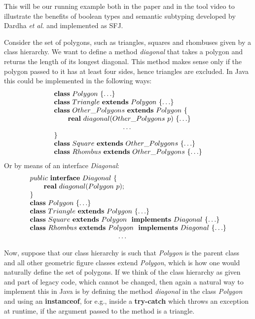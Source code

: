 \documentclass[runningheads]{llncs}
\begin{document}
\begin{example}[Polygons]
\label{polygons}
This will be our running example both in the paper and in the tool video \cite{UD20} to illustrate the benefits of boolean types and semantic subtyping developed by Dardha \emph{et al.} \cite{Dardha2013,Dardha2017} and implemented as SFJ.

Consider the set of polygons, such as triangles, squares and rhombuses given by a class hierarchy.
We want to define a method \emph{diagonal} that takes a polygon and returns the length of its longest diagonal. This method makes sense only if the polygon passed to it has at least four sides, hence triangles are excluded.
In Java this could be implemented in the following ways:
$$
\begin{array}{l}
\synclass Polygon \ \{ \ldots\}
\\
\syndecl{Triangle}{Polygon} {\ldots}
\\
\syndecl{Other\_Polygons}{Polygon} {
\\
	\qquad \mathbf{real}\ diagonal(Other\_Polygons \ p)\ \{\ldots \}
	\\
	\hspace{3.5cm} \ldots
	\\
}
\\
\syndecl{Square}{Other\_Polygons}{\ldots}
\\
\syndecl{Rhombus}{Other\_Polygons} {\ldots}
\end{array}
$$
Or by means of an interface \emph{Diagonal}:
$$
\begin{array}{l}
public \ \syninterface Diagonal\ \{
	\\
	\qquad \mathbf{real}\ diagonal(Polygon \ p);
	\\
\}
\\
\synclass Polygon \ \{\ldots\}
\\
\syndecl{Triangle}{Polygon} {\ldots}
\\
\synidecl{Square}{Polygon} \synimpl Diagonal \ \{\ldots\}
\\
\synidecl{Rhombus}{Polygon} \synimpl Diagonal \ \{\ldots\}
\\
\hspace{4.5cm} \ldots
\end{array}
$$

Now, suppose that our class hierarchy is such that \emph{Polygon} is the parent class and all other geometric figure classes extend \emph{Polygon}, which is how one would naturally define the set of polygons.
If we think of the class hierarchy as given and part of legacy code, which cannot be changed, then again a natural way to implement this in Java is by defining the method \emph{diagonal} in the class \emph{Polygon} and using an \textbf{instanceof}, for e.g., inside a \textbf{try-catch} which throws an exception at runtime, if the argument passed to the method is a triangle.


\end{example}
\end{document}
